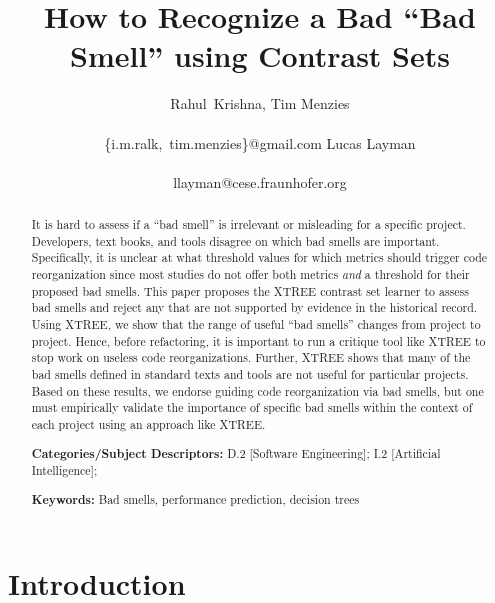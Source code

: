 \documentclass{sig-alternate}
\begin{document}
  


\title{  How to Recognize  a Bad  ``Bad Smell'' using Contrast Sets}
\author{  
\alignauthor
Rahul~Krishna, Tim Menzies  \\
       \\
       {\{i.m.ralk,~tim.menzies\}@gmail.com}
\alignauthor
Lucas Layman \\
       \\ 
       {llayman@cese.fraunhofer.org}
\setlength{\columnsep}{7mm}}
\maketitle
\begin{abstract} 
It is hard to assess
if a ``bad smell'' is irrelevant or misleading
for a specific project.
Developers, text books, and tools
disagree on which bad smells are important. 
Specifically, it is unclear at what threshold values
for which metrics should trigger code reorganization  since
most studies do not offer
both metrics {\em and} a threshold for their proposed bad smells.
This paper proposes the XTREE contrast set
learner to assess bad smells
and reject any that are not supported by
evidence in the historical record.  
Using XTREE, we   show that the range of useful
``bad smells'' changes from project to project. Hence,
before refactoring, it is important to run a critique tool
like XTREE to stop work on useless code reorganizations.
Further, XTREE shows that many
of the bad smells defined in standard texts and tools
are not useful for particular projects. 
Based on these results, we endorse  
guiding code reorganization via bad smells, but one must empirically validate the importance of specific bad smells within the context of each project using an approach like XTREE.

 
{\bf Categories/Subject Descriptors:} D.2 [Software Engineering]; I.2 [Artificial Intelligence];

 
{\bf Keywords:} Bad smells,
performance prediction,  decision trees 
\end{abstract}

\section{Introduction}
\end{document}

